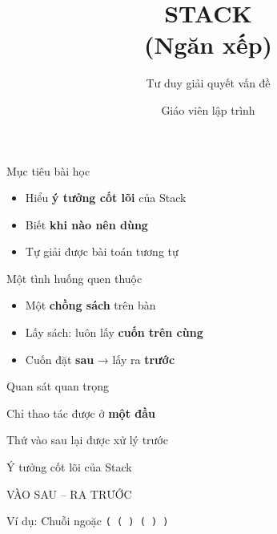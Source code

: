 \documentclass[aspectratio=169]{beamer}
\title{\Huge STACK \\[6pt] \Large (Ngăn xếp)}
\subtitle{\Large Tư duy giải quyết vấn đề}
\author{\large Giáo viên lập trình}
\date{}
\begin{document}
\begin{frame}
  \titlepage
\end{frame}

\begin{frame}{Mục tiêu bài học}
\Large
\begin{itemize}
    \item Hiểu \textbf{ý tưởng cốt lõi} của Stack
    \item Biết \textbf{khi nào nên dùng}
    \item Tự giải được bài toán tương tự
\end{itemize}
\end{frame}

\begin{frame}{Một tình huống quen thuộc}
\Large
\begin{itemize}
    \item Một \textbf{chồng sách} trên bàn
    \item Lấy sách: luôn lấy \textbf{cuốn trên cùng}
    \item Cuốn đặt \textbf{sau} → lấy ra \textbf{trước}
\end{itemize}
\end{frame}

\begin{frame}{Quan sát quan trọng}
\Large
\begin{block}{}
\centering
Chỉ thao tác được ở \textbf{một đầu}
\end{block}

\vspace{10pt}

\begin{block}{}
\centering
Thứ vào sau lại được xử lý trước
\end{block}
\end{frame}

\begin{frame}{Ý tưởng cốt lõi của Stack}
\Huge
\begin{alertblock}{}
\centering
VÀO SAU -- RA TRƯỚC
\end{alertblock}
\end{frame}

\begin{frame}{Ví dụ: Chuỗi ngoặc}
\Huge
\centering
\texttt{( ( ) ( ) )}
\end{frame}
\end{document}
